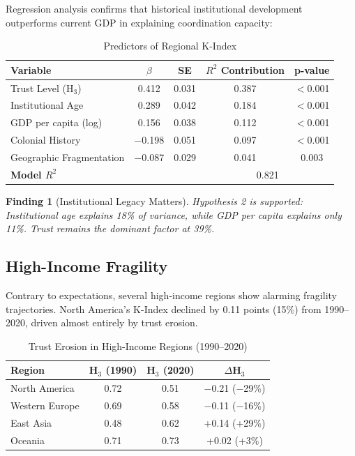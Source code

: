 \documentclass[12pt,a4paper]{article}
\newtheorem{finding}{Finding}
\begin{document}
Regression analysis confirms that historical institutional development outperforms current GDP in explaining coordination capacity:

\begin{table}[H]
\centering
\caption{Predictors of Regional K-Index}
\label{tab:regression}
\begin{tabular}{lcccc}
\toprule
\textbf{Variable} & \textbf{$\beta$} & \textbf{SE} & \textbf{$R^2$ Contribution} & \textbf{p-value} \\
\midrule
Trust Level (H$_3$) & 0.412 & 0.031 & 0.387 & $<$0.001 \\
Institutional Age & 0.289 & 0.042 & 0.184 & $<$0.001 \\
GDP per capita (log) & 0.156 & 0.038 & 0.112 & $<$0.001 \\
Colonial History & $-$0.198 & 0.051 & 0.097 & $<$0.001 \\
Geographic Fragmentation & $-$0.087 & 0.029 & 0.041 & 0.003 \\
\midrule
\multicolumn{3}{l}{\textbf{Model $R^2$}} & \multicolumn{2}{c}{0.821} \\
\bottomrule
\end{tabular}
\end{table}

\begin{finding}[Institutional Legacy Matters]
Hypothesis 2 is supported: Institutional age explains 18\% of variance, while GDP per capita explains only 11\%. Trust remains the dominant factor at 39\%.
\end{finding}

\subsection{High-Income Fragility}

Contrary to expectations, several high-income regions show alarming fragility trajectories. North America's K-Index declined by 0.11 points (15\%) from 1990--2020, driven almost entirely by trust erosion.

\begin{table}[H]
\centering
\caption{Trust Erosion in High-Income Regions (1990--2020)}
\label{tab:trust_erosion}
\begin{tabular}{lccc}
\toprule
\textbf{Region} & \textbf{H$_3$ (1990)} & \textbf{H$_3$ (2020)} & \textbf{$\Delta$H$_3$} \\
\midrule
North America & 0.72 & 0.51 & $-$0.21 ($-$29\%) \\
Western Europe & 0.69 & 0.58 & $-$0.11 ($-$16\%) \\
East Asia & 0.48 & 0.62 & +0.14 (+29\%) \\
Oceania & 0.71 & 0.73 & +0.02 (+3\%) \\
\bottomrule
\end{tabular}
\end{table}
\end{document}
